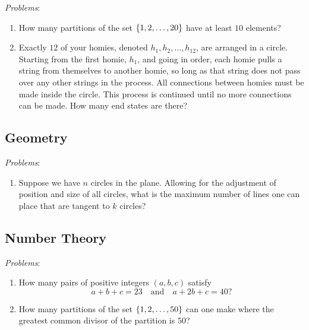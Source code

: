 \textit{Problems}: 
\begin{enumerate}
    \item How many partitions of the set \( \left\{ 1, 2, \ldots, 20 \right\} \) have at
        least \( 10 \) elements?

    \item Exactly \( 12 \) of your homies,  denoted \( h_1, h_2,\ldots,
        h_{12} \), are arranged in a circle. Starting from the first homie, \(
        h_1 \), and going in order, each homie pulls a string from themselves
        to another homie, so long as that string does not pass over any other
        strings in the process. All connections between homies must be made
        inside the circle. This process is continued until no more connections
        can be made. How many end states are there?
\end{enumerate}

\subsection{Geometry}

\textit{Problems}: 
\begin{enumerate}
    \item Suppose we have \( n \) circles in the plane.  Allowing for the adjustment of position and size of all circles, what is
        the maximum number of lines one can place that are tangent to \( k \) circles?
\end{enumerate}

\subsection{Number Theory}

\textit{Problems}: 
\begin{enumerate}
    \item How many pairs of positive integers \( \left( a, b, c \right) \) satisfy
        \[
            a + b + c = 23 \quad \text{and} \quad a + 2b + c = 40
        ?\]

    \item How many partitions of the set \( \left\{ 1, 2, \ldots, 50 \right\} \) can one
        make where the greatest common divisor of the partition is \( 50 \)?
\end{enumerate}

